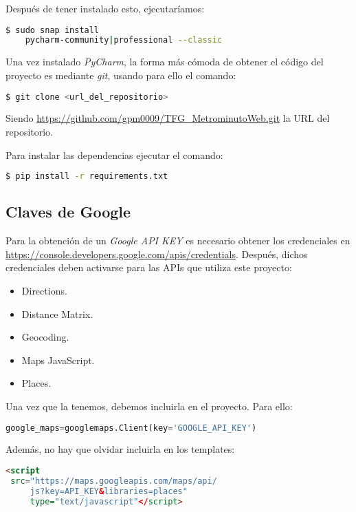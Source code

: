 Después de tener instalado esto, ejecutaríamos:
\begin{lstlisting}[language=bash,caption={Instalar PyCharm}]
$ sudo snap install 
	pycharm-community|professional --classic
\end{lstlisting}

Una vez instalado \textit{PyCharm}, la forma más cómoda de obtener el código del proyecto es mediante \textit{git}, usando para ello el comando:

\renewcommand{\lstlistingname}{Configurar PyCharm}%
\renewcommand{\lstlistlistingname}{List of \lstlistingname s}
\begin{lstlisting}[language=bash,caption={Descargar el repositorio}]
$ git clone <url_del_repositorio>
\end{lstlisting}
Siendo \url{https://github.com/gpm0009/TFG_MetrominutoWeb.git} la URL del 
repositorio.

Para instalar las dependencias ejecutar el comando:
\begin{lstlisting}[language=bash,caption={Instalar requirements.txt}]
$ pip install -r requirements.txt
\end{lstlisting}

\subsection{Claves de Google}
Para la obtención de un \textit{Google API KEY} es necesario obtener los credenciales en  \url{https://console.developers.google.com/apis/credentials}.
Después, dichos credenciales deben activarse para las APIs que utiliza este proyecto:
\begin{itemize}
	\item Directions.
	\item Distance Matrix.
	\item Geocoding.
	\item Maps JavaScript.
	\item Places.
\end{itemize}

Una vez que la tenemos, debemos incluirla en el proyecto. Para ello:
\renewcommand{\lstlistingname}{Google Key}%
\renewcommand{\lstlistlistingname}{List of \lstlistingname s}
\begin{lstlisting}[language=python,caption={Añadir \texttt{API\_KEY}}]
google_maps=googlemaps.Client(key='GOOGLE_API_KEY')
\end{lstlisting}

Además, no hay que olvidar incluirla en los templates:
\begin{lstlisting}[language=html,caption={Añadir \texttt{API\_KEY} a los templates}]
<script
 src="https://maps.googleapis.com/maps/api/
	 js?key=API_KEY&libraries=places" 
	 type="text/javascript"</script>
\end{lstlisting}

